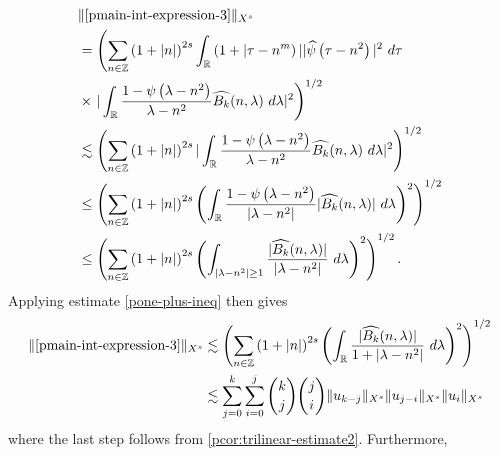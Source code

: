 \begin{equation*}
  \begin{split}
    & \| \eqref{pmain-int-expression-3} \|_{X^s} 
    \\
    & = \left( \sum_{n \in \mathbb{Z}} \left (1 + |n| \right )^{2s} \int_{\mathbb{R}} \left( 1 + | \tau - n^{m
    } \right ) | | \widehat{\psi}\left( \tau - n^{2} \right) |^2 \ d \tau
    \right.
    \\
    & \times \left . |
    \int_{\mathbb{R}} \frac{1 - \psi\left( \lambda - n^{2} \right)}{\lambda -
    n^{2}} \widehat{{B_k}}(n, \lambda) \ d \lambda |^2  \right)^{1/2}
    \\
    & \lesssim \left( \sum_{n \in \mathbb{Z}} \left (1 + |n| \right )^{2s} | \int_{\mathbb{R}}
    \frac{1 - \psi\left( \lambda - n^{2} \right)}{\lambda - n^{2}}
    \widehat{{B_k}}(n, \lambda) \ d\lambda |^2 \right)^{1/2}
    \\
    & \le \left( \sum_{n \in \mathbb{Z}} \left (1 + |n| \right )^{2s}  \left ( \int_{\mathbb{R}}
    \frac{1 - \psi\left( \lambda - n^{2} \right)}{|\lambda - n^{2}|}
    |\widehat{{B_k}}(n, \lambda) | \ d\lambda \right )^2 \right)^{1/2}
    \\
    & \le \left( \sum_{n \in \mathbb{Z}} \left (1 + |n| \right )^{2s}  \left ( \int_{| \lambda - 
    n^{2} | \ge 1}
    \frac{|\widehat{{B_k}}(n, \lambda) | }{|\lambda - n^{2}|}
    \ d\lambda \right )^2 \right)^{1/2}.
  \end{split}
\end{equation*}
%
%
Applying estimate \eqref{pone-plus-ineq} then gives
%
\begin{equation}
  \label{pmain-int3-est-X-s-part}
  \begin{split}
    \| \eqref{pmain-int-expression-3} \|_{X^s}
    & \lesssim \left( \sum_{n \in \mathbb{Z}} \left (1 + |n| \right )^{2s}  \left ( \int_{\mathbb{R}}
    \frac{|\widehat{{B_k}}(n, \lambda)| }{1 + |\lambda - n^{2}|}
     \ d\lambda \right )^2 \right)^{1/2}
     \\
    & \lesssim \sum_{j=0}^{k} \sum_{i=0}^{j} {k \choose j}{j \choose i}
    \|u_{k-j}\|_{X^s} \| u_{j-i}\|_{X^s}
    \| u_i \|_{X^s}
  \end{split}
\end{equation}
%
where the last step follows from \cref{pcor:trilinear-estimate2}.
Furthermore, 
%
%
